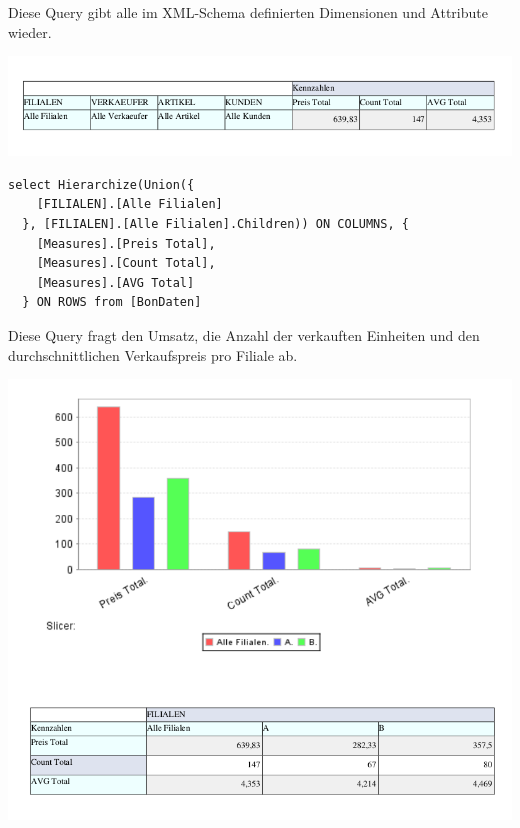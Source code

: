 \documentclass{scrreprt}
\begin{document}
Diese Query gibt alle im XML-Schema definierten Dimensionen und Attribute wieder.

\includegraphics[width=\textwidth]{queries/query1.png}

\begin{lstlisting}[caption={Query 2}]
  select Hierarchize(Union({
    [FILIALEN].[Alle Filialen]
  }, [FILIALEN].[Alle Filialen].Children)) ON COLUMNS, {
    [Measures].[Preis Total],
    [Measures].[Count Total],
    [Measures].[AVG Total]
  } ON ROWS from [BonDaten]
\end{lstlisting}

Diese Query fragt den Umsatz, die Anzahl der verkauften Einheiten und den durchschnittlichen Verkaufspreis pro Filiale ab.

\includegraphics[width=\textwidth]{queries/query2.png}
\end{document}
